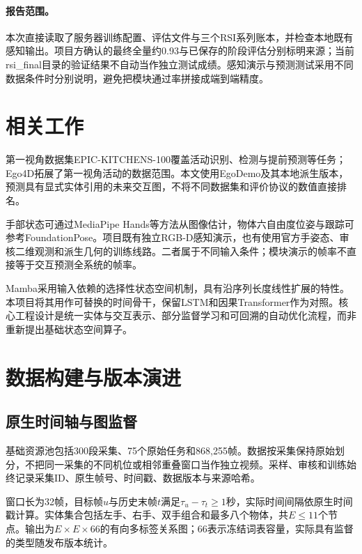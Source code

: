 \paragraph{报告范围。}
本次直接读取了服务器训练配置、评估文件与三个RSI系列账本，并检查本地既有感知输出。项目方确认的最终全量约0.93与已保存的阶段评估分别标明来源；当前rsi\_final目录的验证结果不自动当作独立测试成绩。感知演示与预测测试采用不同数据条件时分别说明，避免把模块通过率拼接成端到端精度。

\section{相关工作}
第一视角数据集EPIC-KITCHENS-100覆盖活动识别、检测与提前预测等任务\cite{damen2022rescaling}；Ego4D拓展了第一视角活动的数据范围\cite{grauman2022ego4d}。本文使用EgoDemo及其本地派生版本\cite{egodemo}，预测具有显式实体引用的未来交互图，不将不同数据集和评价协议的数值直接排名。

手部状态可通过MediaPipe Hands等方法从图像估计\cite{zhang2020mediapipe}，物体六自由度位姿与跟踪可参考FoundationPose\cite{wen2024foundationpose}。项目既有独立RGB-D感知演示，也有使用官方手姿态、审核二维观测和派生几何的训练线路。二者属于不同输入条件；模块演示的帧率不直接等于交互预测全系统的帧率。

Mamba采用输入依赖的选择性状态空间机制，具有沿序列长度线性扩展的特性\cite{gu2023mamba}。本项目将其用作可替换的时间骨干，保留LSTM和因果Transformer作为对照。核心工程设计是统一实体与交互表示、部分监督学习和可回溯的自动优化流程，而非重新提出基础状态空间算子。



\section{数据构建与版本演进}
\subsection{原生时间轴与图监督}
基础资源池包括300段采集、75个原始任务和868,255帧。数据按采集保持原始划分，不把同一采集的不同机位或相邻重叠窗口当作独立视频。采样、审核和训练始终记录采集ID、原生帧号、时间戳、数据版本与来源哈希。

窗口长为32帧，目标帧$u$与历史末帧$t$满足$\tau_u-\tau_t\geq1$秒，实际时间间隔依原生时间戳计算。实体集合包括左手、右手、双手组合和最多八个物体，共$E\leq11$个节点。输出为$E\times E\times66$的有向多标签关系图；66表示冻结词表容量，实际具有监督的类型随发布版本统计。

